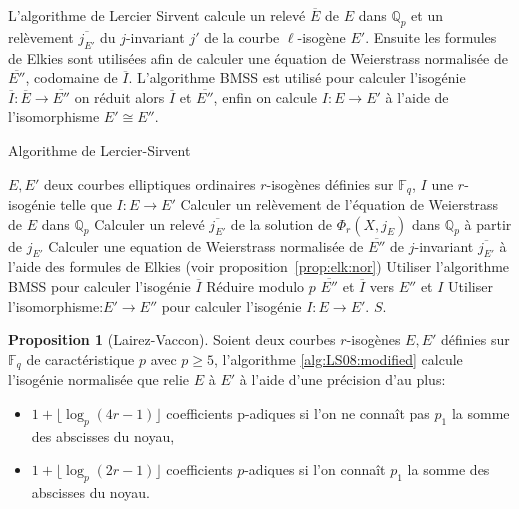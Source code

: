 \documentclass[10pt,a4paper]{book}
\theoremstyle{plain}
\theoremstyle{definition}
\theoremstyle{definition}
\theoremstyle{definition}
\newtheorem{prop}[thm]{Proposition}
\theoremstyle{definition}
\theoremstyle{remark}
\theoremstyle{remark}
\theoremstyle{definition}
\begin{document}
L'algorithme de Lercier Sirvent calcule un relevé $\overline{E}$ de $E$ dans 
$\mathbb{Q}_p$ et un relèvement $\overline{j_{E'}}$ du $j$-invariant $j'$ de la
courbe $\ell$-isogène $E'$. Ensuite les formules de Elkies \cite{elkies1998} sont utilisées afin  de calculer une équation de Weierstrass normalisée de $\overline{E''}$, codomaine de $\overline{I}$. L'algorithme BMSS \cite{BMSS08} est utilisé pour calculer l'isogénie $\overline{I}:\overline{E} \rightarrow \overline{E''}$ on réduit alors $\overline{I}$ et $\overline{E''}$, enfin on calcule $I: E \rightarrow E' $ à l'aide de l'isomorphisme $E' \cong E''$. 

\begin{algorithm}
\caption{\label{alg:LS08:modified} Algorithme de Lercier-Sirvent}
\begin{algorithmic}[1]
\REQUIRE $E,E'$ deux courbes elliptiques ordinaires $r$-isogènes définies sur $\mathbb{F}_q$,%
\ENSURE $I$ une $r$-isogénie telle que $I:E \rightarrow E'$
\STATE Calculer un relèvement de l'équation de Weierstrass de $E$ dans $\mathbb{Q}_p$
\STATE \label{alg:LS08:modified:rel:polmod} Calculer un relevé $\overline{j_{E'}}$ de la solution de $\Phi_{r}(X,j_E)$ dans $\mathbb{Q}_p$ à partir de $j_{E'}$
\STATE Calculer une equation de Weierstrass normalisée de $\overline{E''}$ de $j$-invariant $\overline{j_{E'}}$ à l'aide des formules de Elkies (voir proposition~\ref{prop:elk:nor})
\STATE Utiliser l'algorithme BMSS pour calculer l'isogénie $\overline{I}$
\STATE Réduire modulo $p$ $\overline{E''}$ et $\overline{I}$ vers $E''$ et $I$
\STATE Utiliser l'isomorphisme:$E' \rightarrow E''$ pour calculer l'isogénie $I: E \rightarrow E'$.
\RETURN$S$. 
\end{algorithmic}
\end{algorithm}

\begin{prop}[Lairez-Vaccon]
Soient deux courbes $r$-isogènes $E,E'$ définies sur $\mathbb{F}_q$ de caractéristique $p$ avec $p \geqslant 5$, l'algorithme \ref{alg:LS08:modified} calcule l'isogénie normalisée que relie $E$ à $E'$ à l'aide d'une précision d'au plus: 
\begin{itemize}
\item $ 1 + \lfloor \log_p(4 r - 1) \rfloor $ coefficients p-adiques si l'on ne connaît pas $p_1$ la somme des abscisses du noyau,
\item  $ 1 + \lfloor \log_p(2 r - 1) \rfloor $ coefficients $p$-adiques si l'on connaît $p_1$ la somme des abscisses du noyau.
\end{itemize}
\end{prop}
\end{document}
